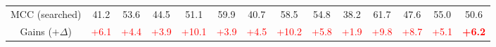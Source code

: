 \begin{figure}[htbp]
\begin{minipage}[t]{1\linewidth}
{\begin{tabular}{cccccccccccccc}
			MCC (searched) & 41.2 & 53.6 & 44.5 & 51.1 & 59.9 & 40.7 & 58.5 & 54.8 & 38.2 & 61.7 & 47.6 & 55.0 & 50.6 \\
			Gains ($+\Delta$) & \textcolor{red}{+6.1} & \textcolor{red}{+4.4} & \textcolor{red}{+3.9} & \textcolor{red}{+10.1} & \textcolor{red}{+3.9} & \textcolor{red}{+4.5} & \textcolor{red}{+10.2} & \textcolor{red}{+5.8} & \textcolor{red}{+1.9} & \textcolor{red}{+9.8} & \textcolor{red}{+8.7} & \textcolor{red}{+5.1} & \textcolor{red}{\textbf{+6.2}} \\
			\bottomrule
	\end{tabular}}
	\label{tab:domainnet-search}
\vspace{1mm}
\end{minipage}


\end{figure}
